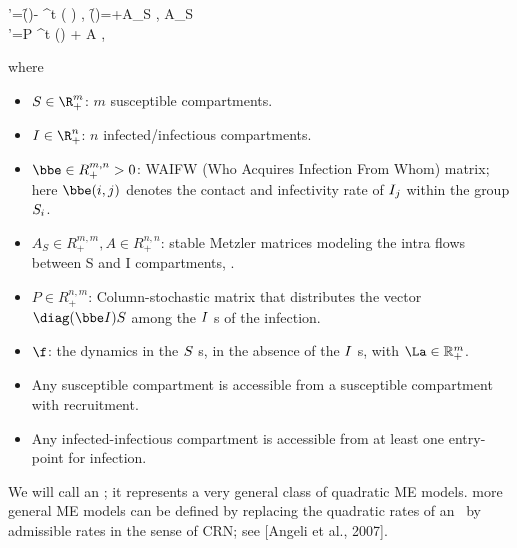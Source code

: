\bc
\y'=\f(\y)- \y^t \diag ( \bbe \x ) , \qu \f(\y)=\Lambda +A_S \y,  A_S \\
\x'=P \y^t \diag (\bbe \x ) + A \x %
\ec,
\ee
\iffalse
\begin{align}
\dot{S} &= \Lambda - \diag(\mu_S) S + A_S S - \diag(BI) S \\
\dot{I} &= P \diag(BI) S - \diag(\mu_I + \gamma_I) I + A I, \\
\end{align}
\fi
where
\begin{itemize}
 \item $S \in \R^m_+$: $m$ susceptible compartments.
 \item $I \in \R^n_+$: $n$ infected/infectious compartments.
 \item $\bbe \in R_+^{m,n} > 0$: WAIFW (Who Acquires Infection From Whom) matrix; here $ \bbe (i,j) $ denotes the contact and infectivity rate of $ I _j $ within the group $ S_i $.
 \item $A_S \in R_+^{m,m}, A\in R_+^{n,n}$: stable Metzler matrices modeling the intra flows between S and I compartments, \resp.
 \item $P\in R_+^{n,m}$: Column-stochastic matrix that distributes the vector $\diag (\bbe \x ) \y$ among the $I$ \com s of the infection.
 \item $\f $: the dynamics in the $S$ \com s, in the absence of the $I$ \com s, with $\La\in \mathbb{R}_+^m$.
 \end{itemize}



\begin{hypothesis} \label{hyp: bilinear_model}
\begin{itemize}
\item Any susceptible compartment is accessible from a susceptible compartment with recruitment.

\item Any infected-infectious compartment is accessible from at least one entry-point for infection.
\end{itemize}
\end{hypothesis}

\beR We will call  an \ABP; it represents a very general class
of quadratic ME models. \Fr more general ME models can be defined by replacing the quadratic rates of an \ABP\ by admissible rates in the sense of CRN; see [Angeli et al., 2007].
\eeR




